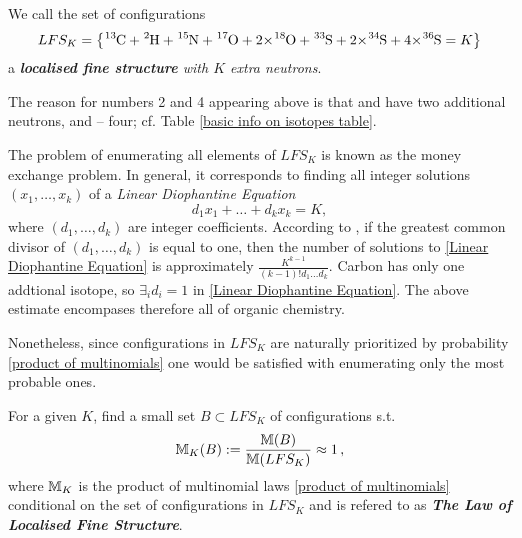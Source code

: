\begin{mydef}\label{localised fine structure definition}
	We call the set of configurations  
	{\small
		\begin{equation}\label{LFS_K}
			LFS_K	=
			\left\{ 
				\cem{^{13}C} + \cem{^{2}H} +  \cem{^{15}N} +  \cem{^{17}O} +  \cem{2 $\times$^{18}O} +  \cem{^{33}S} +  \cem{2 $\times$^{34}S} + \cem{4 $\times$^{36}S} = K	
			\right\}
		\end{equation}
	}
	a \emph{\textbf{localised fine structure} with $K$ extra neutrons}.  	
\end{mydef}

The reason for numbers 2 and 4 appearing above is that  and  have two additional neutrons, and  -- four; cf. Table \ref{basic info on isotopes table}.

The problem of enumerating all elements of $LFS_K$ is known as the money exchange problem. In general, it corresponds to finding all integer solutions $(x_1, \dots, x_k)$ of a {\it Linear Diophantine Equation}  
\begin{equation}\label{Linear Diophantine Equation}
	d_1 x_1 + \dots + d_k x_k = K,
\end{equation}
where $(d_1, \dots, d_k)$ are integer coefficients. According to \cite{Agnarsson2002OnTheSylvesterDenumerants}, if the greatest common divisor of $(d_1, \dots, d_k)$ is equal to one, then the number of solutions to \eqref{Linear Diophantine Equation} is approximately $\frac{K^{k-1}}{(k-1)! d_1 \dots d_k}$. Carbon has only one addtional isotope, so $\exists_i d_i = 1$ in \eqref{Linear Diophantine Equation}. The above estimate encompases therefore all of organic chemistry. 

Nonetheless, since configurations in $LFS_K$ are naturally prioritized by probability \eqref{product of multinomials} one would be satisfied with enumerating only the most probable ones. 


\begin{Problem}\label{Problem of finding LFS_K configurations.}
	For a given $K$, find a small set $B \subset LFS_K$ of configurations s.t. 
	\begin{equation}\label{problem equation}
		\mathbb{M}_K (B) := \frac{ \mathbb{M}(B) }{ \mathbb{M}( LFS_K ) } \approx 1\,,	
	\end{equation} 
	where $\mathbb{M}_K$ is the product of multinomial laws \eqref{product of multinomials} conditional on the set of configurations in $LFS_K$ and is refered to as \emph{\textbf{The Law of Localised Fine Structure}}.
\end{Problem}


